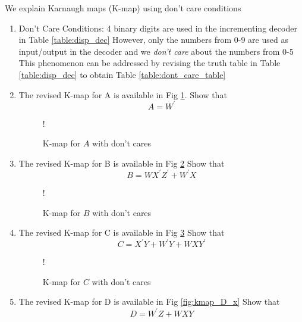 We explain Karnaugh maps (K-map) using don't care conditions
%
\begin{enumerate}[label=\arabic*.,ref=\theenumi]
\item {Don't Care Conditions: }
4 binary digits are used in the incrementing decoder in 
		Table 
\ref{table:disp_dec}
		However, only the numbers from 0-9 are used as input/output
in the decoder and we {\em don't care} about the numbers from 0-5  This phenomenon can be addressed by revising the truth table in 
		Table 
\ref{table:disp_dec}
to obtain Table \ref{table:dont_care_table}
\begin{table*}[!ht]
	\centering

\caption{}
\label{table:dont_care_table}
\end{table*}
\item  The revised K-map for A is available in Fig \ref{fig:kmap_A_x}.  Show that 
\begin{equation}
A = {W}^{\prime}
\end{equation}
\begin{figure}[!ht]
\resizebox {\columnwidth} {!} {

}
\caption{K-map for $A$ with don't cares}
\label{fig:kmap_A_x}
\end{figure}
%
\item  The revised K-map for B is available in Fig \ref{fig:kmap_B_x}  Show that 
%
\begin{equation}
B = WX^{\prime}Z^{\prime} + W^{\prime}X
\end{equation}
\begin{figure}[!ht]
\resizebox {\columnwidth} {!} {

}
\caption{K-map for $B$ with don't cares}
\label{fig:kmap_B_x}
\end{figure}
%
\item  The revised K-map for C is available in Fig \ref{fig:kmap_C_x}  Show that 
%
\begin{equation}
C = {X}^{\prime}{Y} + {W}^{\prime}{Y} + {W}{X}{Y}^{\prime}
\end{equation}
\begin{figure}[!ht]
\resizebox {\columnwidth} {!} {

}
\caption{K-map for $C$ with don't cares}
\label{fig:kmap_C_x}
\end{figure}
%
\item  The revised K-map for D is available in Fig \ref{fig:kmap_D_x}  Show that 
%
\begin{equation}
D  = {W}^{\prime}{Z} + {W}{X}{Y}

\end{equation}
\end{enumerate}
